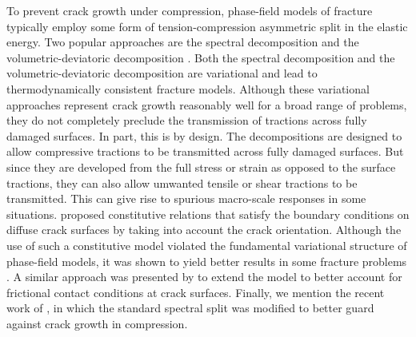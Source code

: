 To prevent crack growth under compression, phase-field models of fracture typically employ some form of tension-compression asymmetric split in the elastic energy. Two popular approaches are the spectral decomposition \cite{miehe_2010_p1, miehe_2010_p2} and the volumetric-deviatoric decomposition \cite{AMOR20091209}. Both the spectral decomposition and the volumetric-deviatoric decomposition are variational and lead to thermodynamically consistent fracture models.
Although these variational approaches represent crack growth reasonably well for a broad range of problems, they do not completely preclude the transmission of tractions across fully damaged surfaces.   In part, this is by design.  The decompositions are designed to allow compressive tractions to be transmitted across fully damaged surfaces.  But since they are developed from the full stress or strain as opposed to the surface tractions, they can also allow umwanted tensile or shear tractions to be transmitted. This can give rise to spurious macro-scale responses in some situations.
\citet{strobl2015novel} proposed constitutive relations that satisfy the boundary conditions on diffuse crack surfaces by taking into account the crack orientation. Although the use of such a constitutive model violated the fundamental variational structure of phase-field models, it was shown to yield better results in some fracture problems \cite{strobl2016constitutive}.  A similar approach was presented by  \citet{fei2019phase, fei2020phasefield} to extend the model to better account for frictional contact conditions at crack surfaces.  Finally, we mention the recent work of \citet{Landis-fatigue}, in which the standard spectral split was modified to better guard against crack growth in compression.

